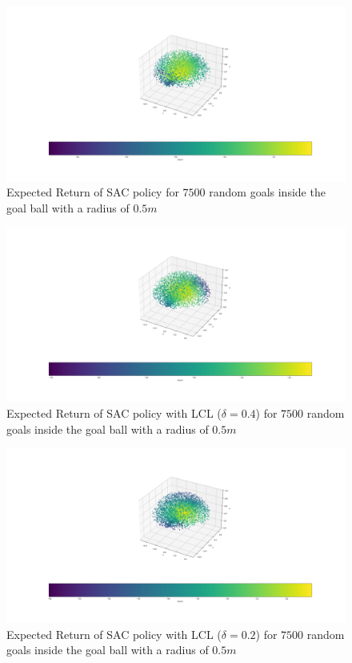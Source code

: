 \begin{figure}
	\centering
	\includegraphics[width=\linewidth]{figures/potentialplot1.png}
	\caption{Expected Return of SAC policy for $7500$ random goals inside the 
	goal ball with a radius of $0.5m$}
	\label{fig:pot1}
\end{figure}

\begin{figure}
	\centering
	\includegraphics[width=\linewidth]{figures/potentialplot2.png}
	\caption{Expected Return of SAC policy with LCL ($\delta = 0.4$) for $7500$ random goals inside the 
	goal ball with a radius of $0.5m$}
	\label{fig:pot2}
\end{figure}

\begin{figure}
	\centering
	\includegraphics[width=\linewidth]{figures/potentialplot3.png}
	\caption{Expected Return of SAC policy with LCL ($\delta = 0.2$) for $7500$ random goals inside the 
	goal ball with a radius of $0.5m$}
	\label{fig:pot3}
\end{figure}

